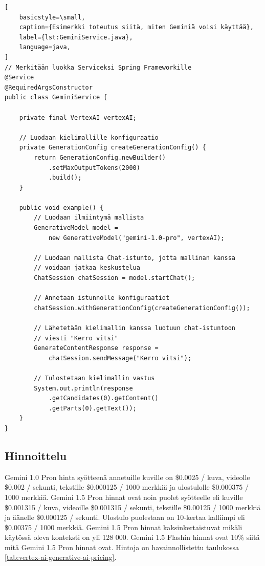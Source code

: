 \begin{lstlisting}[
    basicstyle=\small,
    caption={Esimerkki toteutus siitä, miten Geminiä voisi käyttää},
    label={lst:GeminiService.java},
    language=java,
]
// Merkitään luokka Serviceksi Spring Frameworkille
@Service
@RequiredArgsConstructor
public class GeminiService {

    private final VertexAI vertexAI;

    // Luodaan kielimallille konfiguraatio
    private GenerationConfig createGenerationConfig() {
        return GenerationConfig.newBuilder()
            .setMaxOutputTokens(2000)
            .build();
    }

    public void example() {
        // Luodaan ilmiintymä mallista
        GenerativeModel model =
            new GenerativeModel("gemini-1.0-pro", vertexAI);

        // Luodaan mallista Chat-istunto, jotta mallinan kanssa
        // voidaan jatkaa keskustelua
        ChatSession chatSession = model.startChat();

        // Annetaan istunnolle konfiguraatiot
        chatSession.withGenerationConfig(createGenerationConfig());

        // Lähetetään kielimallin kanssa luotuun chat-istuntoon
        // viesti "Kerro vitsi"
        GenerateContentResponse response =
            chatSession.sendMessage("Kerro vitsi");

        // Tulostetaan kielimallin vastus
        System.out.println(response
            .getCandidates(0).getContent()
            .getParts(0).getText());
    }
}
\end{lstlisting}

\subsection{Hinnoittelu}

Gemini 1.0 Pron hinta syötteenä annetuille kuville on \$0.0025 / kuva, videolle
\$0.002 / sekunti, tekstille \$0.000125 / 1000 merkkiä ja ulostulolle
\$0.000375 / 1000 merkkiä. Gemini 1.5 Pron hinnat ovat noin puolet syötteelle
eli kuville \$0.001315 / kuva, videoille \$0.001315 / sekunti, tekstille
\$0.00125 / 1000 merkkiä ja äänelle \$0.000125 / sekunti. Ulostulo puolestaan
on 10-kertaa kalliimpi eli \$0.00375 / 1000 merkkiä. Gemini 1.5 Pron hinnat
kaksinkertaistuvat mikäli käytössä oleva konteksti on yli 128 000. Gemini
1.5 Flashin hinnat ovat 10\% siitä mitä Gemini 1.5 Pron hinnat ovat.
\parencite{vertexAiGenerativeAiPricing} Hintoja on havainnollistettu taulukossa
\ref{tab:vertex-ai-generative-ai-pricing}.

